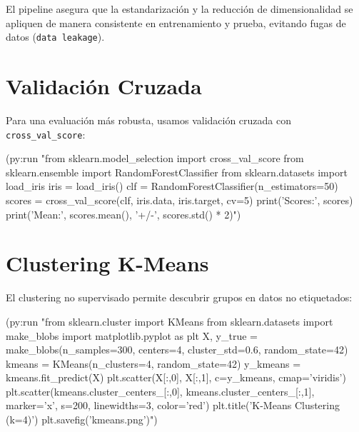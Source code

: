 \begin{center}
\end{center}

El pipeline asegura que la estandarización y la reducción de dimensionalidad
se apliquen de manera consistente en entrenamiento y prueba, evitando
fugas de datos (\texttt{data leakage}).

\section{Validación Cruzada}

Para una evaluación más robusta, usamos validación cruzada con
\texttt{cross\_val\_score}:

\begin{lispcode}
(py:run "from sklearn.model_selection import cross_val_score
from sklearn.ensemble import RandomForestClassifier
from sklearn.datasets import load_iris
iris = load_iris()
clf = RandomForestClassifier(n_estimators=50)
scores = cross_val_score(clf, iris.data, iris.target, cv=5)
print('Scores:', scores)
print('Mean:', scores.mean(), '+/-', scores.std() * 2)")
\end{lispcode}

\section{Clustering K-Means}

El clustering no supervisado permite descubrir grupos en datos no etiquetados:

\begin{lispcode}
(py:run "from sklearn.cluster import KMeans
from sklearn.datasets import make_blobs
import matplotlib.pyplot as plt
X, y_true = make_blobs(n_samples=300, centers=4,
                       cluster_std=0.6, random_state=42)
kmeans = KMeans(n_clusters=4, random_state=42)
y_kmeans = kmeans.fit_predict(X)
plt.scatter(X[:,0], X[:,1], c=y_kmeans, cmap='viridis')
plt.scatter(kmeans.cluster_centers_[:,0],
            kmeans.cluster_centers_[:,1],
            marker='x', s=200, linewidths=3, color='red')
plt.title('K-Means Clustering (k=4)')
plt.savefig('kmeans.png')")
\end{lispcode}


